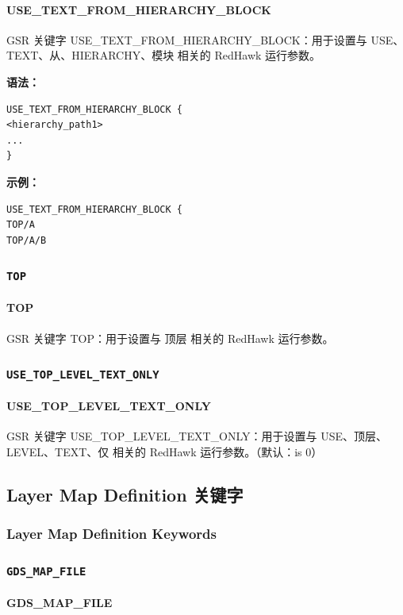 \paragraph*{USE_TEXT_FROM_HIERARCHY_BLOCK}

GSR 关键字 USE_TEXT_FROM_HIERARCHY_BLOCK：用于设置与 USE、TEXT、从、HIERARCHY、模块 相关的 RedHawk 运行参数。

\textbf{语法：}
\begin{lstlisting}
USE_TEXT_FROM_HIERARCHY_BLOCK {
<hierarchy_path1>
...
}
\end{lstlisting}

\textbf{示例：}
\begin{lstlisting}
USE_TEXT_FROM_HIERARCHY_BLOCK {
TOP/A
TOP/A/B
\end{lstlisting}

\subsubsection{\texttt{TOP}}
\paragraph*{TOP}

GSR 关键字 TOP：用于设置与 顶层 相关的 RedHawk 运行参数。

\subsubsection{\texttt{USE_TOP_LEVEL_TEXT_ONLY}}
\paragraph*{USE_TOP_LEVEL_TEXT_ONLY}

GSR 关键字 USE_TOP_LEVEL_TEXT_ONLY：用于设置与 USE、顶层、LEVEL、TEXT、仅 相关的 RedHawk 运行参数。（默认：is 0）

\subsection{Layer Map Definition 关键字}
\subsubsection*{Layer Map Definition Keywords}

\subsubsection{\texttt{GDS_MAP_FILE}}
\paragraph*{GDS_MAP_FILE}


